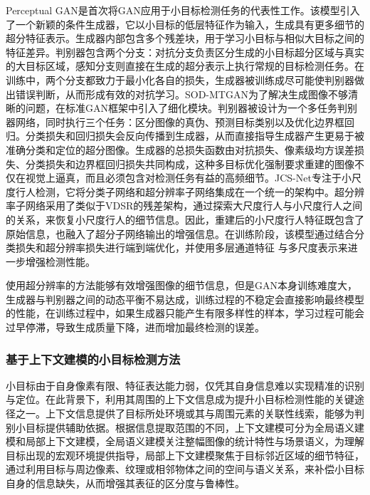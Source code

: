 Perceptual GAN\cite{Li2017PerceptualGA}是首次将GAN应用于小目标检测任务的代表性工作。该模型引入了一个新颖的条件生成器，它以小目标的低层特征作为输入，生成具有更多细节的超分特征表示。生成器内部包含多个残差块，用于学习小目标与相似大目标之间的特征差异。判别器包含两个分支：对抗分支负责区分生成的小目标超分区域与真实的大目标区域，感知分支则直接在生成的超分表示上执行常规的目标检测任务。在训练中，两个分支都致力于最小化各自的损失，生成器被训练成尽可能使判别器做出错误判断，从而形成有效的对抗学习。SOD-MTGAN\cite{Bai2018SODMTGAN}为了解决生成图像不够清晰的问题，在标准GAN框架中引入了细化模块。判别器被设计为一个多任务判别器网络，同时执行三个任务：区分图像的真伪、预测目标类别以及优化边界框回归。分类损失和回归损失会反向传播到生成器，从而直接指导生成器产生更易于被准确分类和定位的超分图像。生成器的总损失函数由对抗损失、像素级均方误差损失、分类损失和边界框回归损失共同构成，这种多目标优化强制要求重建的图像不仅在视觉上逼真，而且必须包含对检测任务有益的高频细节。JCS-Net\cite{Pang2019JCSNet}专注于小尺度行人检测，它将分类子网络和超分辨率子网络集成在一个统一的架构中。超分辨率子网络采用了类似于VDSR\cite{Kim2016VDSR}的残差架构，通过探索大尺度行人与小尺度行人之间的关系，来恢复小尺度行人的细节信息。因此，重建后的小尺度行人特征既包含了原始信息，也融入了超分子网络输出的增强信息。在训练阶段，该模型通过结合分类损失和超分辨率损失进行端到端优化，并使用多层通道特征
与多尺度表示来进一步增强检测性能。

使用超分辨率的方法能够有效增强图像的细节信息，但是GAN本身训练难度大，生成器与判别器之间的动态平衡不易达成，训练过程的不稳定会直接影响最终模型的性能，在训练过程中，如果生成器只能产生有限多样性的样本，学习过程可能会过早停滞，导致生成质量下降，进而增加最终检测的误差。

\subsubsection{基于上下文建模的小目标检测方法}
小目标由于自身像素有限、特征表达能力弱，仅凭其自身信息难以实现精准的识别与定位。在此背景下，利用其周围的上下文信息成为提升小目标检测性能的关键途径之一。上下文信息提供了目标所处环境或其与周围元素的关联性线索，能够为判别小目标提供辅助依据。根据信息提取范围的不同，上下文建模可分为全局语义建模和局部上下文建模，全局语义建模关注整幅图像的统计特性与场景语义，为理解目标出现的宏观环境提供指导，局部上下文建模聚焦于目标邻近区域的细节特征，通过利用目标与周边像素、纹理或相邻物体之间的空间与语义关系，来补偿小目标自身的信息缺失，从而增强其表征的区分度与鲁棒性。

